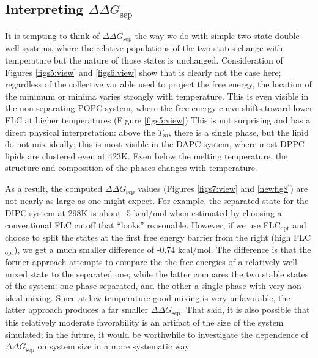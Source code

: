 \documentclass{biophys-new}
\begin{document}
\subsection*{Interpreting $\Delta \Delta G_{\text{sep}}$}

It is tempting to think of $\Delta \Delta G_{\text{sep}}$ the way we do with simple two-state double-well systems, where the relative populations of the two states change with temperature but the nature of those states is unchanged. Consideration of Figures \ref{figs5:view} and \ref{figs6:view} show that is clearly not the case here; regardless of the collective variable used to project the free energy, the location of the minimum or minima varies strongly with temperature. This is even visible in the non-separating POPC system, where the free energy curve shifts toward lower FLC at higher temperatures (Figure \ref{figs5:view}) This is not surprising and has a direct physical interpretation: above the $T_m$, there is a single phase, but the lipid do not mix ideally; this is most visible in the DAPC system, where most DPPC lipids are clustered even at 423K. Even below the melting temperature, the structure and composition of the phases changes with temperature.

As a result, the computed $\Delta \Delta G_{\text{sep}}$ values (Figures \ref{figs7:view} and \ref{newfig8}) are not nearly as large as one might expect. For example, the separated state for the DIPC system at 298K is about -5 kcal/mol when estimated by choosing a conventional FLC cutoff that ``looks'' reasonable. However, if we use FLC$_{\text{opt}}$ and choose to split the states at the first free energy barrier from the right (high FLC$_{\text{opt}}$), we get a much smaller difference of -0.74 kcal/mol.  The difference is that the former approach attempts to compare the the free energies of a relatively well-mixed state to the separated one, while the latter compares the two stable states of the system: one phase-separated, and the other a single phase with very non-ideal mixing. Since at low temperature good mixing is very unfavorable, the latter approach produces a far smaller $\Delta \Delta G_{\text{sep}}$.  That said, it is also possible that this relatively moderate favorability is an artifact of the size of the system simulated; in the future, it would be worthwhile to investigate the dependence of $\Delta \Delta G_{\text{sep}}$ on system size in a more systematic way.
\end{document}

